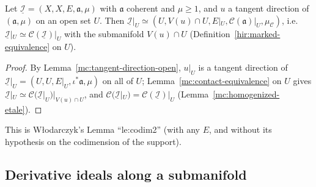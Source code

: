 \begin{lemma}
\label{mc:contact-equivalence-open}
\leanok
Let \(\underline{\mathcal I}=(X,X,E,\mathfrak a,\mu)\) with \(\mathfrak a\) coherent and \(\mu\ge1\), and \(u\) a tangent direction of \((\mathfrak a,\mu)\) on an
open set \(U\). Then \(\underline{\mathcal I}|_U\simeq(U,V(u)\cap U,E|_U,\mathcal C(\mathfrak a)|_U,\mu_{\mathcal C})\), i.e.\
\(\underline{\mathcal I}|_U\simeq\mathcal C(\underline{\mathcal I})|_U\) with the submanifold \(V(u)\cap U\) (Definition~\ref{hir:marked-equivalence} on
\(U\)).
\end{lemma}
\begin{proof}
\leanok
By Lemma~\ref{mc:tangent-direction-open}, \(u|_U\) is a tangent direction of \(\underline{\mathcal I}|_U=(U,U,E|_U,\iota^*\mathfrak a,\mu)\) on all of \(U\);
Lemma~\ref{mc:contact-equivalence} on \(U\) gives \(\underline{\mathcal I}|_U\simeq\mathcal C(\underline{\mathcal I}|_U)|_{V(u)\cap U}\), and
\(\mathcal C(\underline{\mathcal I}|_U)=\mathcal C(\underline{\mathcal I})|_U\) (Lemma~\ref{mc:homogenized-etale}).
\end{proof}
This is Włodarczyk's Lemma ``le:codim2'' (with any \(E\), and without its hypothesis on the codimension of the support).

\subsection{Derivative ideals along a submanifold}

